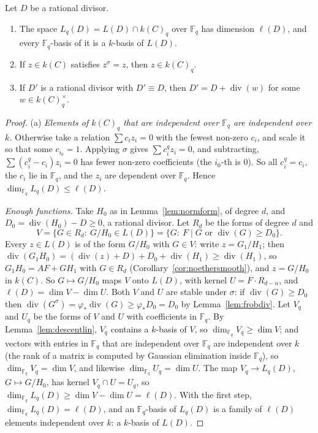 \begin{proposition}[descent]\label{prop:descent}
Let $D$ be a rational divisor.
\begin{enumerate}[label=(\alph*)]
\item The space $L_q(D)=L(D)\cap k(C)_q$ over $\mathbb F_q$ has dimension $\ell(D)$, and every $\mathbb F_q$-basis of it is a $k$-basis of $L(D)$.
\item If $z\in k(C)$ satisfies $z^\sigma=z$, then $z\in k(C)_q$.
\item If $D'$ is a rational divisor with $D'\equiv D$, then $D'=D+\operatorname{div}(w)$ for some $w\in k(C)_q^\times$.
\end{enumerate}
\end{proposition}
\begin{proof}
(a) \emph{Elements of $k(C)_q$ that are independent over $\mathbb F_q$ are independent over $k$.} Otherwise take a relation $\sum c_iz_i=0$ with the fewest
non-zero $c_i$, and scale it so that some $c_{i_0}=1$. Applying $\sigma$ gives $\sum c_i^qz_i=0$, and subtracting, $\sum(c_i^q-c_i)z_i=0$ has fewer non-zero
coefficients (the $i_0$-th is $0$). So all $c_i^q=c_i$, the $c_i$ lie in $\mathbb F_q$, and the $z_i$ are dependent over $\mathbb F_q$. Hence
$\dim_{\mathbb F_q}L_q(D)\le\ell(D)$.

\emph{Enough functions.} Take $H_0$ as in Lemma~\ref{lem:normform}, of degree $d$, and $D_0=\operatorname{div}(H_0)-D\ge0$, a rational divisor. Let $R_d$ be the
forms of degree $d$ and
\[
V=\{G\in R_d:\ G/H_0\in L(D)\}=\{G:\ F\mid G\text{ or }\operatorname{div}(G)\ge D_0\}.
\]
Every $z\in L(D)$ is of the form $G/H_0$ with $G\in V$: write $z=G_1/H_1$; then
$\operatorname{div}(G_1H_0)=(\operatorname{div}(z)+D)+D_0+\operatorname{div}(H_1)\ge\operatorname{div}(H_1)$, so $G_1H_0=AF+GH_1$ with $G\in R_d$
(Corollary~\ref{cor:noethersmooth}), and $z=G/H_0$ in $k(C)$. So $G\mapsto G/H_0$ maps $V$ onto $L(D)$, with kernel $U=F\cdot R_{d-n}$, and
$\ell(D)=\dim V-\dim U$. Both $V$ and $U$ are stable under $\sigma$: if $\operatorname{div}(G)\ge D_0$ then
$\operatorname{div}(G^\sigma)=\varphi_*\operatorname{div}(G)\ge\varphi_*D_0=D_0$ by Lemma~\ref{lem:frobdiv}. Let $V_q$ and $U_q$ be the forms of $V$ and $U$ with
coefficients in $\mathbb F_q$. By Lemma~\ref{lem:descentlin}, $V_q$ contains a $k$-basis of $V$, so $\dim_{\mathbb F_q}V_q\ge\dim V$; and vectors with entries in
$\mathbb F_q$ that are independent over $\mathbb F_q$ are independent over $k$ (the rank of a matrix is computed by Gaussian elimination inside $\mathbb F_q$), so
$\dim_{\mathbb F_q}V_q=\dim V$, and likewise $\dim_{\mathbb F_q}U_q=\dim U$. The map $V_q\to L_q(D)$, $G\mapsto G/H_0$, has kernel $V_q\cap U=U_q$, so
$\dim_{\mathbb F_q}L_q(D)\ge\dim V-\dim U=\ell(D)$. With the first step, $\dim_{\mathbb F_q}L_q(D)=\ell(D)$, and an $\mathbb F_q$-basis of $L_q(D)$ is a family of
$\ell(D)$ elements independent over $k$: a $k$-basis of $L(D)$.


\end{proof}
